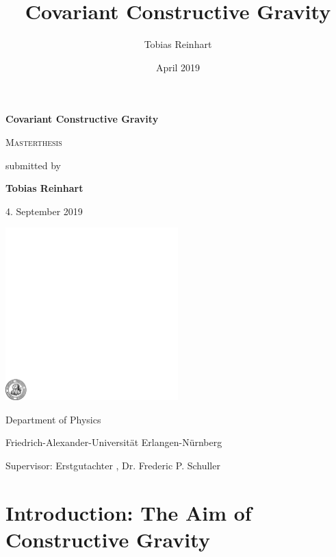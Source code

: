 \documentclass[a4paper,12pt, DIV=14, BCOR=5mm, twoside, headsepline]{scrbook}
\title{Covariant Constructive Gravity}
\author{Tobias Reinhart }
\date{April 2019}
\begin{document}
\begin{titlepage}
	\centering

	{\Huge\bfseries Covariant Constructive Gravity\par}
	\vspace{2cm}
	
	{\scshape\Large Masterthesis \par}
	\vspace{1cm}
	{ submitted by \par}
	
	
	
	{\bfseries Tobias Reinhart\par}
		{ 4. September 2019\par}
	\vspace{2cm}
	
	\includegraphics[width=0.5\textwidth]{fau-siegel.pdf}\par
	\vspace{1cm}Department of Physics\par
	Friedrich-Alexander-Universität Erlangen-Nürnberg\par
	Supervisor: Erstgutachter , Dr. Frederic P. Schuller
	
	\vfill





\end{titlepage}

\tableofcontents

\chapter{Introduction: The Aim of Constructive Gravity}

\end{document}
